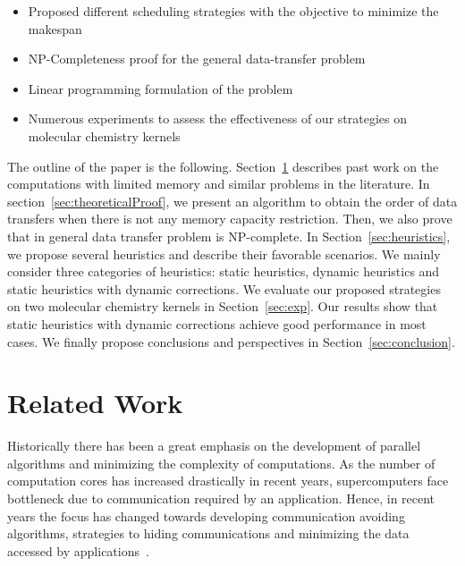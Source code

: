 \documentclass[sigconf]{acmart}
\begin{document}
	
	\renewcommand{\labelitemi}{$\bullet$}
	\begin{itemize}
		\item Proposed different scheduling strategies with the objective to minimize the makespan
		\item NP-Completeness proof for the general data-transfer problem 
		\item Linear programming formulation of the problem
		\item Numerous experiments to assess the effectiveness of our strategies on molecular chemistry kernels 
	\end{itemize}
	
	The outline of the paper is the following. Section~\ref{sec:relatedWork} describes past work on the computations with limited memory and similar problems in the literature. In section~\ref{sec:theoreticalProof}, we present an algorithm to obtain the order of data transfers when there is not any memory capacity restriction. Then, we also prove that in general data transfer problem is NP-complete. In Section~\ref{sec:heuristics}, we propose several heuristics and describe their favorable scenarios. We mainly consider three categories of heuristics: static heuristics, dynamic heuristics and static heuristics with dynamic corrections. We evaluate our proposed strategies on two molecular chemistry kernels in Section~\ref{sec:exp}. Our results show that static heuristics with dynamic corrections achieve good performance in most cases. We finally propose conclusions and perspectives in Section~\ref{sec:conclusion}.
	
	\section{Related Work}
	\label{sec:relatedWork}
	
	Historically there has been a great emphasis on the development of parallel algorithms and minimizing the complexity of computations. As the number of computation cores has increased drastically in recent years, supercomputers face bottleneck due to communication required by an application. Hence, in recent years the focus has changed towards developing communication avoiding algorithms, strategies to hiding communications and minimizing the data accessed by applications~\cite{yelick2016}. 
	
\end{document}
